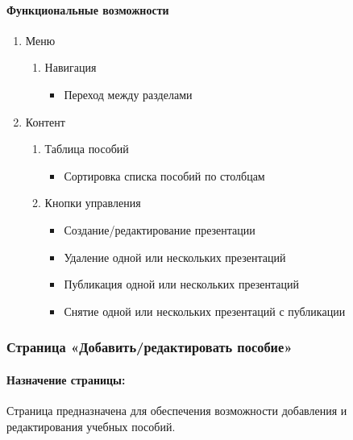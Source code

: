 \paragraph{Функциональные возможности}
\begin{enumerate}
	\item Меню
	\begin{enumerate}
		\item Навигация
		\begin{itemize}
			\item Переход между разделами
		\end{itemize}
	\end{enumerate}

	\item Контент
	\begin{enumerate}
		\item Таблица пособий
		\begin{itemize}
			\item Сортировка списка пособий по столбцам
		\end{itemize}

		\item Кнопки управления
		\begin{itemize}
			\item Создание/редактирование презентации
			\item Удаление одной или нескольких презентаций
			\item Публикация одной или нескольких презентаций
			\item Снятие одной или нескольких презентаций с публикации
		\end{itemize}
	\end{enumerate}
\end{enumerate}


\subsubsection{Страница «Добавить/редактировать пособие»}
\paragraph{Назначение страницы:} Страница предназначена для обеспечения возможности добавления и редактирования учебных пособий.


